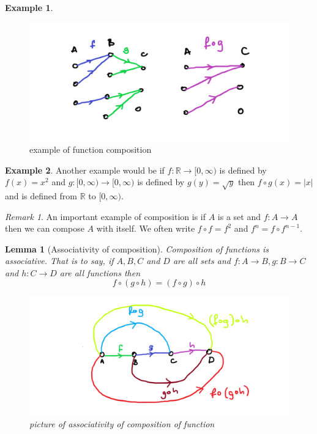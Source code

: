 \documentclass[
]{book}
\newtheorem{lemma}{Lemma}[chapter]
\theoremstyle{definition}
\theoremstyle{definition}
\newtheorem{example}{Example}[chapter]
\theoremstyle{definition}
\theoremstyle{definition}
\theoremstyle{remark}
\newtheorem*{remark}{Remark}
\begin{document}
\begin{example}

\begin{figure}
\centering
\includegraphics{compositionexample.png}
\caption{\label{fig:unnamed-chunk-18}example of function composition}
\end{figure}

\end{example}

\begin{example}
Another example would be if \(f: \mathbb{R} \rightarrow [0,\infty)\) is defined by \(f(x) = x^2\) and \(g: [0,\infty) \rightarrow [0, \infty)\) is defined by \(g(y) = \sqrt{y}\) then \(f \circ g (x) = |x|\) and is defined from \(\mathbb{R}\) to \([0,\infty)\).
\end{example}

\begin{remark}
An important example of composition is if \(A\) is a set and \(f: A \rightarrow A\) then we can compose \(A\) with itself. We often write \(f\circ f = f^2\) and \(f^n= f\circ f^{n-1}\).
\end{remark}

\begin{lemma}[Associativity of composition]

Composition of functions is associative. That is to say, if \(A,B,C\) and \(D\) are all sets and \(f:A \rightarrow B, g: B \rightarrow C\) and \(h: C \rightarrow D\) are all functions then
\[ f \circ (g \circ h) = (f \circ g) \circ h  \]

\begin{figure}
\centering
\includegraphics{compassoc.png}
\caption{\label{fig:unnamed-chunk-19}picture of associativity of composition of function}
\end{figure}

\end{lemma}
\end{document}
